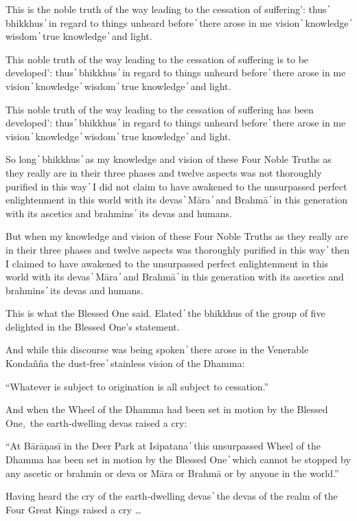 This is the noble truth of the way leading to the cessation of suffering’: thus  ̓  bhikkhus  ̓  in regard to things unheard before  ̓  there arose in me vision  ̓  knowledge  ̓  wisdom  ̓  true knowledge  ̓  and light.

This noble truth of the way leading to the cessation of suffering is to be developed’: thus  ̓  bhikkhus  ̓  in regard to things unheard before  ̓  there arose in me vision  ̓  knowledge  ̓  wisdom  ̓  true knowledge  ̓  and light.

This noble truth of the way leading to the cessation of suffering has been developed’: thus  ̓  bhikkhus  ̓  in regard to things unheard before  ̓  there arose in me vision  ̓  knowledge  ̓  wisdom  ̓  true knowledge  ̓  and light.

So long  ̓  bhikkhus  ̓  as my knowledge and vision of these Four Noble Truths as they really are in their three phases and twelve aspects was not thoroughly purified in this way  ̓  I did not claim to have awakened to the unsurpassed perfect enlightenment in this world with its devas  ̓  Māra  ̓  and Brahmā  ̓  in this generation with its ascetics and brahmins  ̓  its devas and humans.

But when my knowledge and vision of these Four Noble Truths as they really are in their three phases and twelve aspects was thoroughly purified in this way  ̓  then I claimed to have awakened to the unsurpassed perfect enlightenment in this world with its devas  ̓  Māra  ̓  and Brahmā  ̓  in this generation with its ascetics and brahmins  ̓  its devas and humans.

This is what the Blessed One said. Elated  ̓  the bhikkhus of the group of five delighted in the Blessed One’s statement.

And while this discourse was being spoken  ̓  there arose in the Venerable Kondañña the dust-free  ̓  stainless vision of the Dhamma:

“Whatever is subject to origination is all subject to cessation.”

And when the Wheel of the Dhamma had been set in motion by the Blessed One, the earth-dwelling devas raised a cry:

“At Bārāṇasī in the Deer Park at Isipatana  ̓  this unsurpassed Wheel of the Dhamma has been set in motion by the Blessed One  ̓  which cannot be stopped by any ascetic or brahmin or deva or Māra or Brahmā or by anyone in the world.”

Having heard the cry of the earth-dwelling devas  ̓  the devas of the realm of the Four Great Kings raised a cry …

